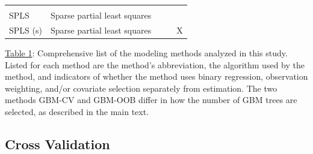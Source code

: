 \begin{longtable}[c]{@{}lcccc@{}}
\begin{minipage}[t]{0.13\columnwidth}
\strut\end{minipage} &
\begin{minipage}[t]{0.13\columnwidth}\centering\strut
\strut\end{minipage}\tabularnewline
\begin{minipage}[t]{0.14\columnwidth}\raggedright\strut
SPLS
\strut\end{minipage} &
\begin{minipage}[t]{0.35\columnwidth}\centering\strut
Sparse partial least squares
\strut\end{minipage} &
\begin{minipage}[t]{0.11\columnwidth}\centering\strut
\strut\end{minipage} &
\begin{minipage}[t]{0.13\columnwidth}\centering\strut
\strut\end{minipage} &
\begin{minipage}[t]{0.13\columnwidth}\centering\strut
\strut\end{minipage}\tabularnewline
\begin{minipage}[t]{0.14\columnwidth}\raggedright\strut
SPLS (s)
\strut\end{minipage} &
\begin{minipage}[t]{0.35\columnwidth}\centering\strut
Sparse partial least squares
\strut\end{minipage} &
\begin{minipage}[t]{0.11\columnwidth}\centering\strut
\strut\end{minipage} &
\begin{minipage}[t]{0.13\columnwidth}\centering\strut
\strut\end{minipage} &
\begin{minipage}[t]{0.13\columnwidth}\centering\strut
X
\strut\end{minipage}\tabularnewline
\bottomrule
\end{longtable}

\hyperref[table:methods]{Table 1}: Comprehensive list of the modeling
methods analyzed in this study. Listed for each method are the method's
abbreviation, the algorithm used by the method, and indicators of
whether the method uses binary regression, observation weighting, and/or
covariate selection separately from estimation. The two methods GBM-CV
and GBM-OOB differ in how the number of GBM trees are selected, as
described in the main text.

\subsection{Cross Validation}\label{cross-validation}

